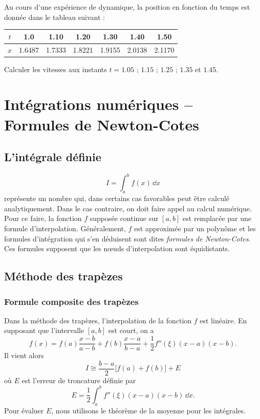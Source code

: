 \begin{exercice}[Exercice 2]
Au cours d'une expérience de dynamique, la position en fonction du temps est
donnée dans le tableau suivant :
\begin{center}
  \begin{tabular}{|c|c|c|c|c|c|c|}
    \hline
    $t$ & 1.0 & 1.10 & 1.20 & 1.30 & 1.40 & 1.50\\ \hline
    $x$ & 1.6487 & 1.7333 & 1.8221 & 1.9155 & 2.0138 & 2.1170\\ \hline
  \end{tabular}
\end{center}
Calculer les vitesses aux instants $t = 1.05$ ; $1.15$ ; $1.25$ ; $1.35$ et
$1.45$.
\end{exercice}

\section{Intégrations numériques -- Formules de Newton-Cotes}

\subsection*{L'intégrale définie}

\[
  I = \int_a^b f(x)\,\dd x
\]
représente un nombre qui, dans certains cas favorables peut être calculé
analytiquement. Dans le cas contraire, on doit faire appel au calcul
numérique. Pour ce faire, la fonction $f$ supposée continue sur $[a,b]$ est
remplacée par une formule d'interpolation. Généralement, $f$ est approximée
par un polynôme et les formules d'intégration qui s'en déduisent sont dites
\emph{formules de Newton-Cotes}. Ces formules supposent que les n\oe uds
d'interpolation sont équidistants.

\subsection{Méthode des trapèzes}

\subsubsection{Formule composite des trapèzes}

Dans la méthode des trapèzes, l'interpolation de la fonction $f$ est
linéaire. En supposant que l'intervalle $[a,b]$ est court, on a
\[
  f(x) = f(a)\frac{x - b}{a - b} + f(b)\frac{x - a}{b - a}
       + \frac{1}{2}f''(\xi)(x - a)(x - b) .
\]
Il vient alors
\[
  I \cong \frac{b - a}{2}\bigl[f(a) + f(b)\bigr] + E
\]
où $E$ est l'erreur de troncature définie par
\[
  E = \frac{1}{2}\int_a^b f''(\xi)(x - a)(x - b)\,\dd x .
\]
Pour évaluer $E$, nous utilisons le théorème de la moyenne pour les
intégrales.

